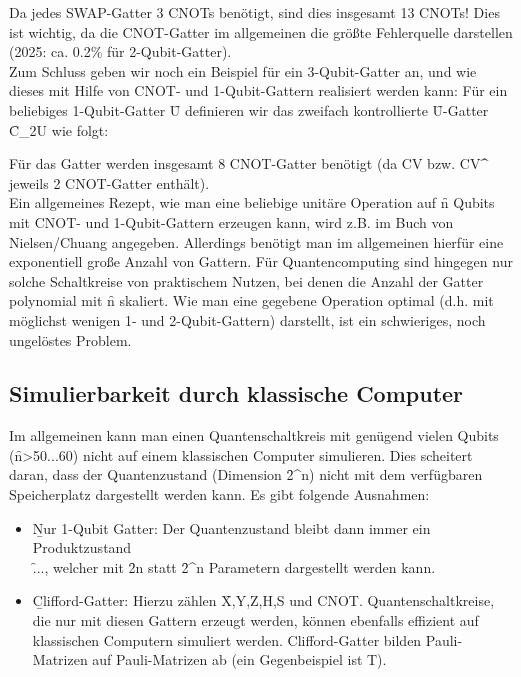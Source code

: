 
Da jedes SWAP-Gatter 3 CNOTs benötigt, sind dies insgesamt 13 CNOTs! Dies ist wichtig, da die CNOT-Gatter im allgemeinen die größte Fehlerquelle darstellen (2025: ca. 0.2\% für 2-Qubit-Gatter).\\
Zum Schluss geben wir noch ein Beispiel für ein 3-Qubit-Gatter an, und wie dieses mit Hilfe von CNOT- und 1-Qubit-Gattern realisiert werden kann: Für ein beliebiges 1-Qubit-Gatter \f{U} definieren wir das zweifach kontrollierte \f{U}-Gatter \f{C_2U} wie folgt:


Für das Gatter werden insgesamt 8 CNOT-Gatter benötigt (da CV bzw. CV\f{^\dagger} jeweils 2 CNOT-Gatter enthält).\\

Ein allgemeines Rezept, wie man eine beliebige unitäre Operation auf \f{n} Qubits mit CNOT- und 1-Qubit-Gattern erzeugen kann, wird z.B. im Buch von Nielsen/Chuang angegeben. Allerdings benötigt man im allgemeinen hierfür eine exponentiell große Anzahl von Gattern. Für Quantencomputing sind hingegen nur solche Schaltkreise von praktischem Nutzen, bei denen die Anzahl der Gatter polynomial mit \f{n} skaliert. Wie man eine gegebene Operation optimal (d.h. mit möglichst wenigen 1- und 2-Qubit-Gattern) darstellt, ist ein schwieriges, noch ungelöstes Problem.

\subsection{Simulierbarkeit durch klassische Computer}
Im allgemeinen kann man einen Quantenschaltkreis mit genügend vielen Qubits (\f{n>50...60}) nicht auf einem klassischen Computer simulieren. Dies scheitert daran, dass der Quantenzustand (Dimension \f{2^n}) nicht mit dem verfügbaren Speicherplatz dargestellt werden kann. Es gibt folgende Ausnahmen:
\begin{itemize}
    \item \b{Nur 1-Qubit Gatter:} Der Quantenzustand bleibt dann immer ein Produktzustand\\
    \f{\otimes{}\otimes...\otimes{}}, welcher mit \f{2n} statt \f{2^n} Parametern dargestellt werden kann.
    \item \b{Clifford-Gatter:} Hierzu zählen \f{X,Y,Z,H,S} und CNOT. Quantenschaltkreise, die nur mit diesen Gattern erzeugt werden, können ebenfalls effizient auf klassischen Computern simuliert werden. Clifford-Gatter bilden Pauli-Matrizen auf Pauli-Matrizen ab (ein Gegenbeispiel ist T).
\end{itemize}

